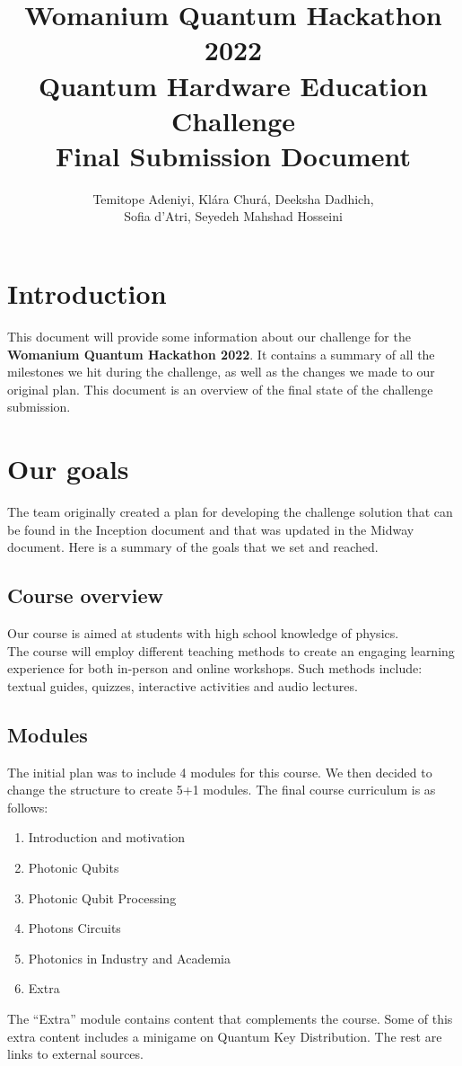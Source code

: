 \documentclass[hidelinks, a4paper,12pt]{article}
\title{Womanium Quantum Hackathon 2022\\Quantum Hardware Education Challenge\\Final Submission Document}
\author{Temitope Adeniyi, Klára Churá, Deeksha Dadhich,\\Sofia d'Atri, Seyedeh Mahshad Hosseini}
\date{}
\begin{document}
\maketitle

\tableofcontents

\section{Introduction}
This document will provide some information about our challenge for the \textbf{Womanium Quantum Hackathon 2022}. It contains a summary of all the milestones we hit during the challenge, as well as the changes we made to our original plan. This document is an overview of the final state of the challenge submission.
\newpage
\section{Our goals}
The team originally created a plan for developing the challenge solution that can be found in the Inception document and that was updated in the Midway document. Here is a summary of the goals that we set and reached.

\subsection{Course overview}
Our course is aimed at students with high school knowledge of physics.\\The course will employ different teaching methods to create an engaging learning experience for both in-person and online workshops. Such methods include: textual guides, quizzes, interactive activities and audio lectures.

\subsection{Modules}
The initial plan was to include 4 modules for this course. We then decided to change the structure to create 5+1 modules. The final course curriculum is as follows:
\begin{enumerate}
  \item Introduction and motivation
  \item Photonic Qubits
  \item Photonic Qubit Processing
  \item Photons Circuits
  \item Photonics in Industry and Academia
  \item Extra
\end{enumerate}
The ``Extra'' module contains content that complements the course. Some of this extra content includes a minigame on Quantum Key Distribution. The rest are links to external sources.
\end{document}
